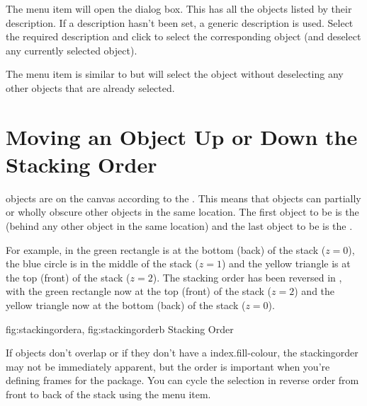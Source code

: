 
The  menu item will open the
 dialog box. This has all the \glspl{object}
listed by their description.  If a description hasn't been set, a
generic description is used.  Select the required description and
click  to select the corresponding \gls{object} (and
deselect any currently selected \gls{object}).


The  menu item is similar to 
 but will select the \gls{object}
without deselecting any other \glspl{object} that are already
selected.

\section{Moving an Object Up or Down the Stacking Order}\label{sec:moveupordown}

\Glspl{object} are  on the
\gls{canvas} according to the
. This means that objects can
partially or wholly obscure other objects in the same location.
The first object to be 
is the  (behind any other object in the same
location) and the last object to be 
is the .

For example, in  the green rectangle is
at the bottom (\gls{back}) of the stack ($z=0$), the blue circle is in
the middle of the stack ($z=1$) and the yellow triangle is at the
top (\gls{front}) of the stack ($z=2$). The stacking order has
been reversed in , with the green
rectangle now at the top (front) of the stack ($z=2$) and
the yellow triangle now at the bottom (back) of the stack
($z=0$).

{
  {fig:stackingordera}{}{},
  {fig:stackingorderb}{}{}
}
{Stacking Order}

If \glspl{object} don't overlap or if they don't have a
\gls{index.fill-colour}, the \gls{stackingorder} may not be
immediately apparent, but the order is important when you're
defining frames for the  package. You can cycle the
selection in reverse order from front to back of the stack using the
 menu item.

